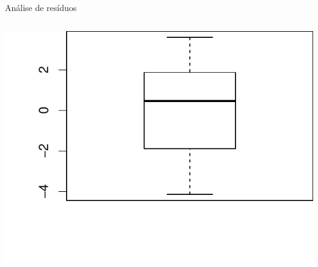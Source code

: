 \documentclass{beamer}\usepackage[]{graphicx}\usepackage[]{color}
\newenvironment{knitrout}{}{} %
\renewenvironment{knitrout}{\setlength{\topsep}{0mm}}{}
\begin{document}
\begin{frame}{Análise de resíduos}
\begin{columns}[c]
\begin{knitrout}
\includegraphics[width=1\linewidth]{figure/r10-2} 

\end{knitrout}
\end{columns}

\end{frame}
\end{document}
